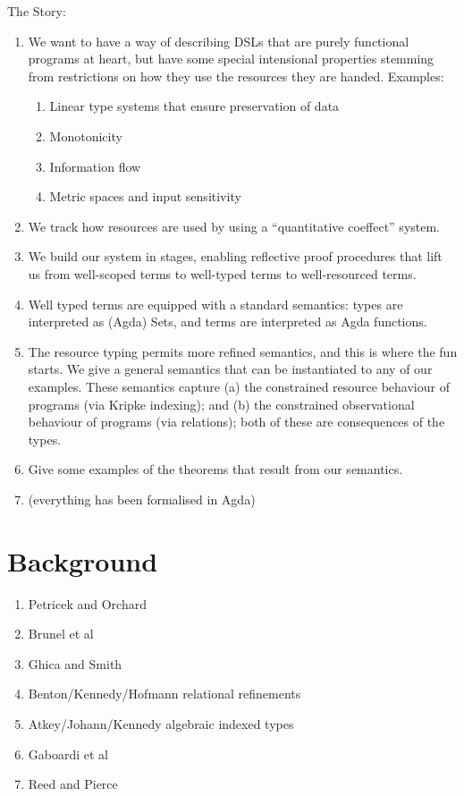 \documentclass[sigplan,review]{acmart}\settopmatter{printfolios=true,printccs=false,printacmref=false}
\begin{document}
The Story:
\begin{enumerate}
\item We want to have a way of describing DSLs that are purely
  functional programs at heart, but have some special intensional
  properties stemming from restrictions on how they use the resources
  they are handed. Examples:
  \begin{enumerate}
  \item Linear type systems that ensure preservation of data
  \item Monotonicity
  \item Information flow
  \item Metric spaces and input sensitivity
  \end{enumerate}
\item We track how resources are used by using a ``quantitative
  coeffect'' system.
\item We build our system in stages, enabling reflective proof
  procedures that lift us from well-scoped terms to well-typed terms
  to well-resourced terms.
\item Well typed terms are equipped with a standard semantics: types
  are interpreted as (Agda) Sets, and terms are interpreted as Agda
  functions.
\item The resource typing permits more refined semantics, and this is
  where the fun starts. We give a general semantics that can be
  instantiated to any of our examples. These semantics capture (a) the
  constrained resource behaviour of programs (via Kripke indexing);
  and (b) the constrained observational behaviour of programs (via
  relations); both of these are consequences of the types.
\item Give some examples of the theorems that result from our
  semantics.
\item (everything has been formalised in Agda)
\end{enumerate}

\section{Background}

\begin{enumerate}
\item Petricek and Orchard
\item Brunel et al
\item Ghica and Smith
\item Benton/Kennedy/Hofmann relational refinements
\item Atkey/Johann/Kennedy algebraic indexed types
\item Gaboardi et al
\item Reed and Pierce
\end{enumerate}
\end{document}
